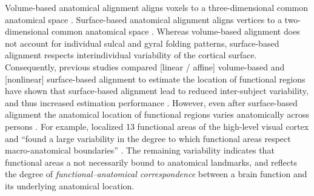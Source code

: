 Volume-based anatomical alignment \citep[s.][for a review]{klein2009evaluation}
aligns voxels to a three-dimensional common anatomical space \citep[e.g., MNI152
atlas;][]{fonov2011unbiased}.
Surface-based anatomical alignment \citep{fischl1999cortical, yeo2009spherical}
aligns vertices to a two-dimensional common anatomical space \citep[e.g.,
FreeSurfer's fsaverage template;][]{fischl1999high}.
Whereas volume-based alignment does not account for individual sulcal and gyral
folding patterns, surface-based alignment respects interindividual variability
of the cortical surface.
Consequently, previous studies compared  [linear / affine] volume-based and
[nonlinear] surface-based alignment to estimate the location of functional
regions have shown that surface-based alignment lead to reduced inter-subject
variability, and thus increased estimation performance
\citep{rosenke2021probabilistic, frost2012measuring, wang2015probabilistic,
weiner2018defining}.
However, even after surface-based alignment the anatomical location of
functional regions varies anatomically across persons
\citep[e.g.,][]{coalson2018impact, benson2014correction, natu2021sulcal,
wang2015probabilistic, frost2012measuring, langers2014assessment, weiner2014mid,
rosenke2021probabilistic}.
For example, \citet{frost2012measuring} localized 13 functional areas of the
high-level visual cortex and ``found a large variability in the degree to which
functional areas respect macro-anatomical boundaries''
\citep{frost2012measuring}.
The remaining variability indicates that functional areas a not necessarily
bound to anatomical landmarks, and reflects the degree of
\textit{functional--anatomical correspondence} between a brain function and its
underlying anatomical location.


%
%


